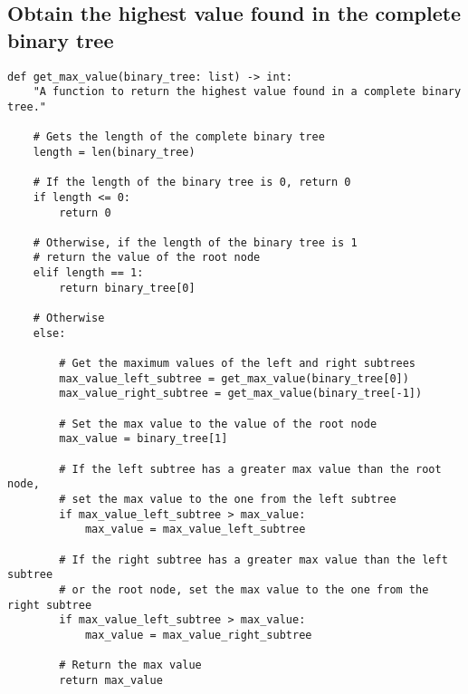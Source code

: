 \documentclass[11pt]{article}
\begin{document}
\subsection{Obtain the highest value found in the complete binary tree}
\label{sec:org756c1aa}
\begin{verbatim}
def get_max_value(binary_tree: list) -> int:
    "A function to return the highest value found in a complete binary tree."

    # Gets the length of the complete binary tree
    length = len(binary_tree)

    # If the length of the binary tree is 0, return 0
    if length <= 0:
        return 0

    # Otherwise, if the length of the binary tree is 1
    # return the value of the root node
    elif length == 1:
        return binary_tree[0]

    # Otherwise
    else:

        # Get the maximum values of the left and right subtrees
        max_value_left_subtree = get_max_value(binary_tree[0])
        max_value_right_subtree = get_max_value(binary_tree[-1])

        # Set the max value to the value of the root node
        max_value = binary_tree[1]

        # If the left subtree has a greater max value than the root node,
        # set the max value to the one from the left subtree
        if max_value_left_subtree > max_value:
            max_value = max_value_left_subtree

        # If the right subtree has a greater max value than the left subtree
        # or the root node, set the max value to the one from the right subtree
        if max_value_left_subtree > max_value:
            max_value = max_value_right_subtree

        # Return the max value
        return max_value
\end{verbatim}

 \newpage
\end{document}
